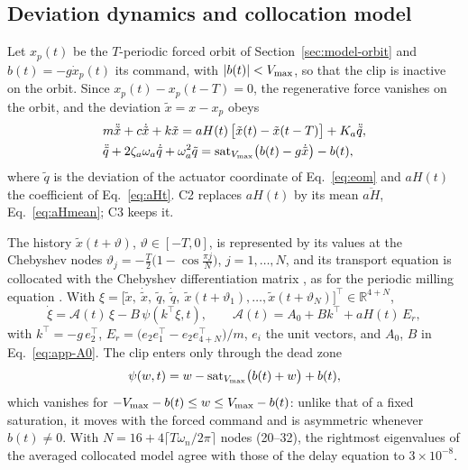 \subsection{Deviation dynamics and collocation model}\label{sec:cert-model}

Let $x_p(t)$ be the $T$-periodic forced orbit of Section~\ref{sec:model-orbit} and $b(t)=-g\dot x_p(t)$ its command, with $\lvert b(t)\rvert<V_{\max}$, so that the clip is inactive on the orbit. Since $x_p(t)-x_p(t-T)=0$, the regenerative force vanishes on the orbit, and the deviation $\tilde x=x-x_p$ obeys
\begin{equation}\label{eq:dev}
\begin{aligned}
&m\ddot{\tilde x}+c\dot{\tilde x}+k\tilde x=aH(t)\,\big[\tilde x(t)-\tilde x(t-T)\big]+K_a\ddot{\tilde q},\\
&\ddot{\tilde q}+2\zeta_a\omega_a\dot{\tilde q}+\omega_a^2\tilde q=\operatorname{sat}_{V_{\max}}\!\big(b(t)-g\dot{\tilde x}\big)-b(t),
\end{aligned}
\end{equation}
where $\tilde q$ is the deviation of the actuator coordinate of Eq.~\eqref{eq:eom} and $aH(t)$ the coefficient of Eq.~\eqref{eq:aHt}. C2 replaces $aH(t)$ by its mean $\overline{aH}$, Eq.~\eqref{eq:aHmean}; C3 keeps it.

The history $\tilde x(t+\vartheta)$, $\vartheta\in[-T,0]$, is represented by its values at the Chebyshev nodes $\vartheta_j=-\tfrac T2\big(1-\cos\tfrac{\pi j}{N}\big)$, $j=1,\dots,N$, and its transport equation is collocated with the Chebyshev differentiation matrix \citep{breda2005pseudospectral,breda2015book}, as for the periodic milling equation \citep{butcher2009chebyshev}. With $\xi=\big[\tilde x,\ \dot{\tilde x},\ \tilde q,\ \dot{\tilde q},\ \tilde x(t+\vartheta_1),\dots,\tilde x(t+\vartheta_N)\big]^\top\in\mathbb R^{4+N}$,
\begin{equation}\label{eq:coll}
\dot\xi=\mathcal A(t)\,\xi-B\,\psi(k^\top\xi,t),\qquad \mathcal A(t)=A_0+Bk^\top+aH(t)\,E_r,
\end{equation}
with $k^\top=-g\,e_2^\top$, $E_r=\big(e_2e_1^\top-e_2e_{4+N}^\top\big)/m$, $e_i$ the unit vectors, and $A_0$, $B$ in Eq.~\eqref{eq:app-A0}. The clip enters only through the dead zone
\begin{equation}\label{eq:deadzone}
\psi(w,t)=w-\operatorname{sat}_{V_{\max}}\!\big(b(t)+w\big)+b(t),
\end{equation}
which vanishes for $-V_{\max}-b(t)\le w\le V_{\max}-b(t)$: unlike that of a fixed saturation, it moves with the forced command and is asymmetric whenever $b(t)\neq0$. With $N=16+4\lceil T\omega_n/2\pi\rceil$ nodes (20--32), the rightmost eigenvalues of the averaged collocated model agree with those of the delay equation to $3\times10^{-8}$.

